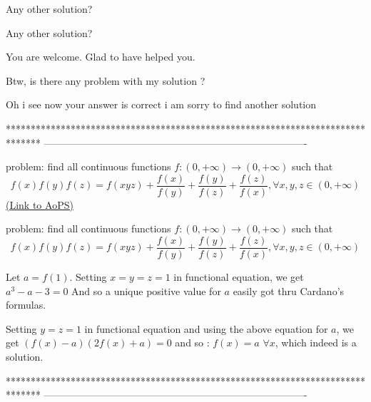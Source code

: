 \begin{solution}
	Any other solution?
\end{solution}



\begin{solution}
	\begin{tcolorbox}Any other solution?\end{tcolorbox}
You are welcome. Glad to have helped you.

Btw, is there any problem with my solution ?
\end{solution}



\begin{solution}
	Oh i see now your answer is correct i am sorry to find another solution
\end{solution}
*******************************************************************************
-------------------------------------------------------------------------------

\begin{problem}
	problem: find all continuous functions $f:(0,+\infty)\to(0,+\infty)$ such that
\[f(x)f(y)f(z)=f(xyz)+\frac{f(x)}{f(y)} +\frac{f(y)}{f(z)} +\frac{f(z)}{f(x)},\forall x,y,z\in (0,+\infty)\]
	\flushright \href{https://artofproblemsolving.com/community/c6h579704}{(Link to AoPS)}
\end{problem}



\begin{solution}
	\begin{tcolorbox}problem: find all continuous functions $f:(0,+\infty)\to(0,+\infty)$ such that
\[f(x)f(y)f(z)=f(xyz)+\frac{f(x)}{f(y)} +\frac{f(y)}{f(z)} +\frac{f(z)}{f(x)},\forall x,y,z\in (0,+\infty)\]\end{tcolorbox}
Let $a=f(1)$.
Setting $x=y=z=1$ in functional equation, we get $a^3-a-3=0$
And so a unique positive value for $a$ easily got thru Cardano's formulas.

Setting $y=z=1$ in functional equation and using the above equation for $a$, we get $(f(x)-a)(2f(x)+a)=0$ and so :
$\boxed{f(x)=a}$ $\forall x$, which indeed is a solution.
\end{solution}
*******************************************************************************
-------------------------------------------------------------------------------

